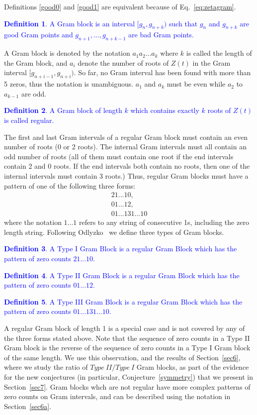 \documentclass[twoside]{article}
\theoremstyle{definition}
\newtheorem{defn}{Definition}
\begin{document}
Definitions \ref{good0} and \ref{good1} are equivalent because of Eq.~\ref{eq:zetagram}.
\textcolor{blue}{
\begin{defn}\label{gramblock}
A Gram block is an interval $[g_n, g_{n+k})$ such that $g_n$  and $g_{n+k}$ are good Gram points 
and $g_{n+1}, . . ., g_{n+k-1}$ are bad Gram points. 
\end{defn}
}
A Gram block is denoted by the notation $a_1a_2 . . . a_k$ where $k$ is called the length of the Gram block, and $a_i$ denote the number of roots of $Z(t)$ in the Gram interval $[g_{n+i-1}, g_{n+i})$. So far, no Gram interval has been found with more than 5 zeros, thus the notation is unambiguous. $a_1$ and $a_k$ must be even while  $a_2$ to $a_{k-1}$ are odd.
\textcolor{blue}{
\begin{defn}\label{regulargramblock}
A Gram block of length $k$ which contains exactly $k$ roots of \textcolor{blue}{$Z(t)$} is called regular. 
\end{defn}
}
The first and last Gram intervals of a regular Gram block must contain an even number of roots (0 or 2 roots). 
The internal Gram intervals must all contain an odd number of roots (all of them must contain one root if the end intervals contain 2 and 0 roots. If the end intervals both contain no roots, then one of the internal intervals must contain 3 roots.) 
Thus, regular Gram blocks must have a pattern of one of the following three forms:
\begin{eqnarray}
21 . . . 10,\nonumber\\
 01 . . . 12,\nonumber \\
 01 . . . 131 . . . 10
\label{types}
\end{eqnarray}
where the notation $1 . . . 1$ refers to any string of consecutive 1s, including the zero length string. 
Following Odlyzko~\cite{Odlyzko 1992} we define three types of Gram blocks.  
\textcolor{blue}{
\begin{defn}\label{gramblockI}
A Type I Gram Block is a regular Gram Block which has the pattern of zero counts $21...10$.
\end{defn}
}
\textcolor{blue}{
\begin{defn}\label{gramblockII}
A Type II Gram Block is a regular Gram Block which has the pattern of zero counts $01 . . . 12$.
\end{defn}
}
\textcolor{blue}{
\begin{defn}\label{gramblockIII}
A Type III Gram Block is a regular Gram Block which has the pattern of zero counts $01 . . . 131 . . . 10$.
\end{defn}
}
A regular Gram block of length 1 is a special case and is not covered by any of the three forms stated above. Note that the sequence of zero counts in a Type II Gram block is the reverse of the sequence of zero counts in a Type I Gram block of the same length. We use this observation, and the results of Section~\ref{sec6}, where we study the ratio of $Type~II/Type~I$ Gram blocks, as part of the evidence for the new conjectures (in particular,  Conjecture~\ref{symmetry}) that we present in Section~\ref{sec7}. Gram blocks whch are not regular have more complex patterns of zero counts on Gram intervals, and can be described using the notation in Section~\ref{sec6a}.
\end{document}
